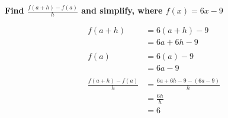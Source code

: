 \documentclass[crop=false,fleqn]{standalone}
\begin{document}
    \textbf{Find $\frac{f(a+h)-f(a)}{h}$ and simplify, where $f(x)=6x-9$}

    \begin{align*}
        f(a+h) &= 6(a+h) - 9 \\
            &= 6a + 6h -9 \\
        \\
        f(a) &= 6(a) - 9 \\
            &= 6a - 9 \\
        \\
        \frac{f(a+h)-f(a)}{h} &= \frac{6a + 6h - 9 - (6a -9)}{h} \\
            &= \frac{6h}{h} \\
            &= 6
    \end{align*}
\end{document}
